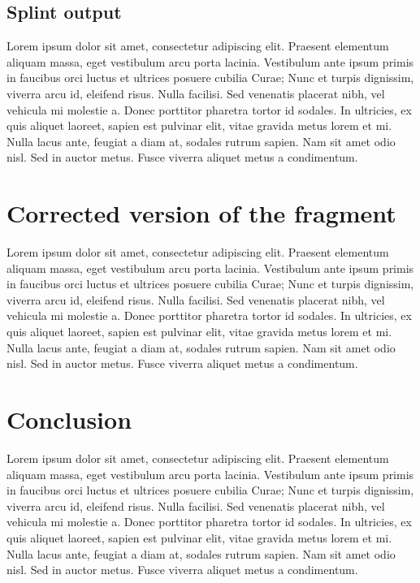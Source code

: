 \documentclass[a4paper,12pt]{article}
\begin{document}
\subsection{Splint output}
Lorem ipsum dolor sit amet, consectetur adipiscing elit. Praesent elementum aliquam massa, eget vestibulum arcu porta lacinia. Vestibulum ante ipsum primis in faucibus orci luctus et ultrices posuere cubilia Curae; Nunc et turpis dignissim, viverra arcu id, eleifend risus. Nulla facilisi. Sed venenatis placerat nibh, vel vehicula mi molestie a. Donec porttitor pharetra tortor id sodales. In ultricies, ex quis aliquet laoreet, sapien est pulvinar elit, vitae gravida metus lorem et mi. Nulla lacus ante, feugiat a diam at, sodales rutrum sapien. Nam sit amet odio nisl. Sed in auctor metus. Fusce viverra aliquet metus a condimentum.

\newpage
\section{Corrected version of the fragment}
Lorem ipsum dolor sit amet, consectetur adipiscing elit. Praesent elementum aliquam massa, eget vestibulum arcu porta lacinia. Vestibulum ante ipsum primis in faucibus orci luctus et ultrices posuere cubilia Curae; Nunc et turpis dignissim, viverra arcu id, eleifend risus. Nulla facilisi. Sed venenatis placerat nibh, vel vehicula mi molestie a. Donec porttitor pharetra tortor id sodales. In ultricies, ex quis aliquet laoreet, sapien est pulvinar elit, vitae gravida metus lorem et mi. Nulla lacus ante, feugiat a diam at, sodales rutrum sapien. Nam sit amet odio nisl. Sed in auctor metus. Fusce viverra aliquet metus a condimentum.

\newpage
\section{Conclusion}
Lorem ipsum dolor sit amet, consectetur adipiscing elit. Praesent elementum aliquam massa, eget vestibulum arcu porta lacinia. Vestibulum ante ipsum primis in faucibus orci luctus et ultrices posuere cubilia Curae; Nunc et turpis dignissim, viverra arcu id, eleifend risus. Nulla facilisi. Sed venenatis placerat nibh, vel vehicula mi molestie a. Donec porttitor pharetra tortor id sodales. In ultricies, ex quis aliquet laoreet, sapien est pulvinar elit, vitae gravida metus lorem et mi. Nulla lacus ante, feugiat a diam at, sodales rutrum sapien. Nam sit amet odio nisl. Sed in auctor metus. Fusce viverra aliquet metus a condimentum.
\end{document}
